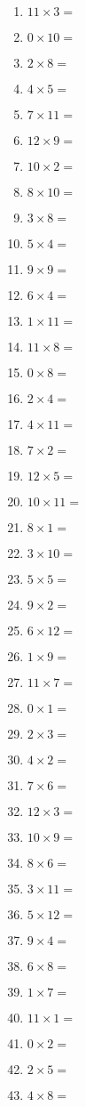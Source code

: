 \documentclass{article}
\begin{document}
\begin{multicols}{4}
\begin{enumerate}[label=\arabic*.,itemsep=0pt,parsep=0pt]
\item $11 \times 3 =$
\item $0 \times 10 =$
\item $2 \times 8 =$
\item $4 \times 5 =$
\item $7 \times 11 =$
\item $12 \times 9 =$
\item $10 \times 2 =$
\item $8 \times 10 =$
\item $3 \times 8 =$
\item $5 \times 4 =$
\item $9 \times 9 =$
\item $6 \times 4 =$
\item $1 \times 11 =$
\item $11 \times 8 =$
\item $0 \times 8 =$
\item $2 \times 4 =$
\item $4 \times 11 =$
\item $7 \times 2 =$
\item $12 \times 5 =$
\item $10 \times 11 =$
\item $8 \times 1 =$
\item $3 \times 10 =$
\item $5 \times 5 =$
\item $9 \times 2 =$
\item $6 \times 12 =$
\item $1 \times 9 =$
\item $11 \times 7 =$
\item $0 \times 1 =$
\item $2 \times 3 =$
\item $4 \times 2 =$
\item $7 \times 6 =$
\item $12 \times 3 =$
\item $10 \times 9 =$
\item $8 \times 6 =$
\item $3 \times 11 =$
\item $5 \times 12 =$
\item $9 \times 4 =$
\item $6 \times 8 =$
\item $1 \times 7 =$
\item $11 \times 1 =$
\item $0 \times 2 =$
\item $2 \times 5 =$
\item $4 \times 8 =$

\end{enumerate}
\end{multicols}
\end{document}
